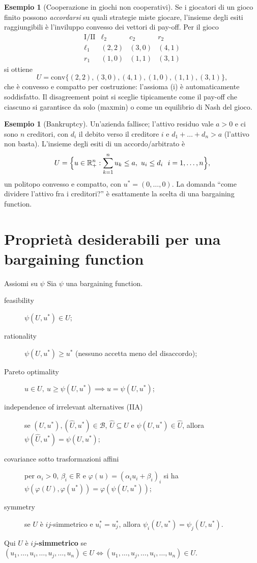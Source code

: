 \documentclass[12pt,a4paper,twoside]{book}
\theoremstyle{plain}
\theoremstyle{definition}
\newtheorem{example}[theorem]{Esempio}
\begin{document}
\begin{example}[Cooperazione in giochi non cooperativi]
Se i giocatori di un gioco finito possono \emph{accordarsi} su quali strategie miste giocare,
l'insieme degli esiti raggiungibili è l'inviluppo convesso dei vettori di pay-off.
Per il gioco
\[
\begin{array}{c|ccc}
 \text{I}/\text{II} & \ell_2 & c_2 & r_2\\\hline
 \ell_1 & (2,2) & (3,0) & (4,1)\\
 r_1    & (1,0) & (1,1) & (3,1)
\end{array}
\]
si ottiene
\[
  U=\mathrm{conv}\{(2,2),(3,0),(4,1),(1,0),(1,1),(3,1)\},
\]
che è convesso e compatto per costruzione: l'assioma (i) è automaticamente soddisfatto.
Il disagreement point si sceglie tipicamente come il pay-off che ciascuno si garantisce
da solo (maxmin) o come un equilibrio di Nash del gioco.
\end{example}

\begin{example}[Bankruptcy]
Un'azienda fallisce; l'attivo residuo vale $a>0$ e ci sono $n$ creditori, con $d_i$ il
debito verso il creditore $i$ e $d_1+\dots+d_n>a$ (l'attivo non basta). L'insieme degli
esiti di un accordo/arbitrato è
\[
  U=\Bigl\{u\in\mathbb{R}^n_+ : \sum_{k=1}^n u_k\le a,\ u_i\le d_i\ \ i=1,\dots,n\Bigr\},
\]
un politopo convesso e compatto, con $u^*=(0,\dots,0)$. La domanda ``come dividere
l'attivo fra i creditori?'' è esattamente la scelta di una bargaining function.
\end{example}

\section{Proprietà desiderabili per una bargaining function}

\begin{defbox}{Assiomi su $\psi$}
Sia $\psi$ una bargaining function.
\begin{description}
  \item[feasibility] $\psi(U,u^*)\in U$;
  \item[rationality] $\psi(U,u^*)\ge u^*$ (nessuno accetta meno del disaccordo);
  \item[Pareto optimality] $u\in U,\ u\ge\psi(U,u^*)\implies u=\psi(U,u^*)$;
  \item[independence of irrelevant alternatives (IIA)] se $(U,u^*),(\widehat U,u^*)\in\mathcal{B}$,
        $\widehat U\subseteq U$ e $\psi(U,u^*)\in\widehat U$, allora
        $\psi(\widehat U,u^*)=\psi(U,u^*)$;
  \item[covariance sotto trasformazioni affini] per $\alpha_i>0$, $\beta_i\in\mathbb{R}$ e
        $\varphi(u)=(\alpha_iu_i+\beta_i)_i$ si ha
        $\psi(\varphi(U),\varphi(u^*))=\varphi(\psi(U,u^*))$;
  \item[symmetry] se $U$ è $ij$-simmetrico e $u^*_i=u^*_j$, allora
        $\psi_i(U,u^*)=\psi_j(U,u^*)$.
\end{description}
Qui $U$ è \textbf{$ij$-simmetrico} se
$(u_1,\dots,u_i,\dots,u_j,\dots,u_n)\in U\iff(u_1,\dots,u_j,\dots,u_i,\dots,u_n)\in U$.
\end{defbox}
\end{document}
